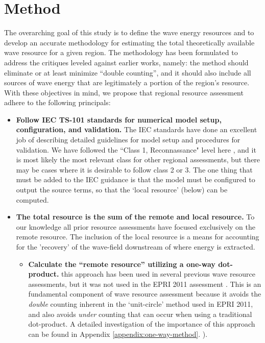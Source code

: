 \section{Method} \label{sec:method}
The overarching goal of this study is to define the wave energy resources and to develop an accurate methodology for estimating the total theoretically available wave resource for a given region. The methodology has been formulated to address the critiques leveled against earlier works, namely: the method should eliminate or at least minimize ``double counting'', and it should also include all sources of wave energy that are legitimately a portion of the region's resource. With these objectives in mind, we propose that regional resource assessment adhere to the following principals:

\begin{itemize}
\item {\bf Follow IEC TS-101 standards for numerical model setup, configuration, and validation.} The IEC standards have done an excellent job of describing detailed guidelines for model setup and procedures for validation. We have followed the ``Class 1, Reconnassance" level here , and it is most likely the most relevant class for other regional assessments, but there may be cases where it is desirable to follow class 2 or 3. The one thing that must be added to the IEC guidance is that the model must be configured to output the source terms, so that the `local resource' (below) can be computed.
\item {\bf The total resource is the sum of the remote and local resource.} To our knowledge all prior resource assessments have focused exclusively on the remote resource. The inclusion of the local resource is a means for accounting for the 'recovery' of the wave-field downstream of where energy is extracted.
\begin{itemize}
    \item {\bf Calculate the ``remote resource'' utilizing a one-way dot-product.} this approach has been used in several previous wave resource assessments, but it was not used in the EPRI 2011 assessment . This is an fundamental component of wave resource assessment because it avoids the {\em double} counting inherent in the `unit-circle' method used in EPRI 2011, and also avoids {\em under} counting that can occur when using a traditional dot-product. A detailed investigation of the importance of this approach can be found in Appendix \ref{appendix:one-way-method}. \cite{EPRIwaveresource2011}).

\end{itemize}
\end{itemize}
